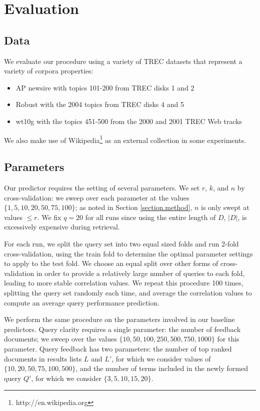 \documentclass{sig-alternate}
\begin{document}
\section{Evaluation}\label{section.evaluation}

\subsection{Data}\label{section.evaluation.data}

We evaluate our procedure using a variety of TREC datasets that represent a variety of corpora properties:

\begin{itemize}
	\item AP newsire with topics 101-200 from TREC disks 1 and 2
	\item Robust with the 2004 topics from TREC disks 4 and 5
	\item wt10g with the topics 451-500 from the 2000 and 2001 TREC Web tracks
\end{itemize}

We also make use of Wikipedia\footnote{http://en.wikipedia.org} as an external collection in some experiments.

\subsection{Parameters}\label{section.evaluation.runs}

Our predictor requires the setting of several parameters. We set $r$, $k$, and $n$ by cross-validation: we sweep over each parameter at the values $\{1, 5, 10, 20, 50, 75, 100\}$; as noted in Section \ref{section.method}, $n$ is only swept at values $\leq r$. We fix $q = 20$ for all runs since using the entire length of $D$, $|D|$, is excessively expensive during retrieval.

For each run, we split the query set into two equal sized folds and run 2-fold cross-validation, using the train fold to determine the optimal parameter settings to apply to the test fold. We choose an equal split over other forms of cross-validation in order to provide a relatively large number of queries to each fold, leading to more stable correlation values. We repeat this procedure 100 times, splitting the query set randomly each time, and average the correlation values to compute an average query performance prediction.

We perform the same procedure on the parameters involved in our baseline predictors. Query clarity requires a single parameter: the number of feedback documents; we sweep over the values $\{10, 50, 100, 250, 500, 750, 1000\}$ for this parameter. Query feedback has two parameters: the number of top ranked documents in results lists $L$ and $L'$, for which we consider values of $\{10, 20, 50, 75, 100, 500\}$, and the number of terms included in the newly formed query $Q'$, for which we consider $\{3, 5, 10, 15, 20\}$.
\end{document}
